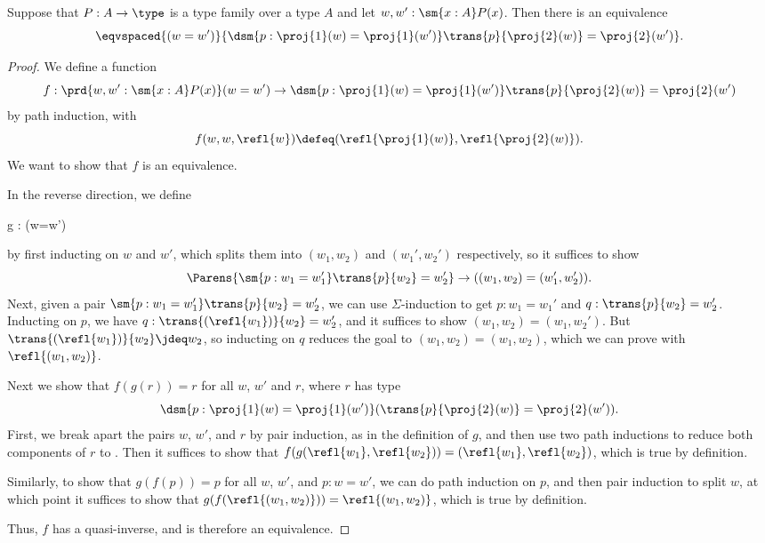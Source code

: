 %
\begin{thm}\label{thm:path-sigma}
Suppose that $P:A\to\type$ is a type family over a type $A$ and let $w,w':\sm{x:A}P(x)$. Then there is an equivalence
\begin{equation*}
\eqvspaced{(w=w')}{\dsm{p:\proj{1}(w)=\proj{1}(w')} \trans{p}{\proj{2}(w)}=\proj{2}(w')}.
\end{equation*}
\end{thm}

\begin{proof}
We define a function
\begin{equation*}
f : \prd{w,w':\sm{x:A}P(x)} (w=w') \to \dsm{p:\proj{1}(w)=\proj{1}(w')} \trans{p}{\proj{2}(w)}=\proj{2}(w')
\end{equation*}
by path induction, with
\begin{equation*}
f(w,w,\refl{w})\defeq(\refl{\proj{1}(w)},\refl{\proj{2}(w)}).
\end{equation*}
We want to show that $f$ is an equivalence.

In the reverse direction, we define
\begin{narrowmultline*}
  g : 
      \to
      \narrowbreak
      (w=w')
\end{narrowmultline*}
by first inducting on $w$ and $w'$, which splits them into $(w_1,w_2)$ and
$(w_1',w_2')$ respectively, so it suffices to show
\begin{equation*}
\Parens{\sm{p:w_1 = w_1'}\trans{p}{w_2}=w_2'} \to ((w_1,w_2)=(w_1',w_2')).
\end{equation*}
Next, given a pair $\sm{p:w_1 = w_1'}\trans{p}{w_2}=w_2'$, we can
use $\Sigma$-induction to get $p : w_1 = w_1'$ and $q :
\trans{p}{w_2}=w_2'$.  Inducting on $p$, we have $q :
\trans{(\refl{w_1})}{w_2}=w_2'$, and it suffices to show
$(w_1,w_2)=(w_1,w_2')$.  But $\trans{(\refl{w_1})}{w_2} \jdeq w_2$, so
inducting on $q$ reduces the goal to
$(w_1,w_2)=(w_1,w_2)$, which we can prove with $\refl{(w_1,w_2)}$.

Next we show that $f(g(r))=r$ for all $w$, $w'$ and
$r$, where $r$ has type
\[\dsm{p:\proj{1}(w)=\proj{1}(w')} (\trans{p}{\proj{2}(w)}=\proj{2}(w')).\]
First, we break apart the pairs $w$, $w'$, and $r$ by pair induction, as in the
definition of $g$, and then use two path inductions to reduce both components
of $r$ to .  Then it suffices to show that
$f (g(\refl{w_1},\refl{w_2})) = (\refl{w_1},\refl{w_2})$, which is true by definition.

Similarly, to show that $g(f(p))=p$ for all $w$, $w'$,
and $p : w = w'$, we can do path induction on $p$, and then pair induction to
split $w$, at which point it suffices to show that
$g(f (\refl{(w_1,w_2)})) = \refl{(w_1,w_2)}$, which is true by
definition.

Thus, $f$ has a quasi-inverse, and is therefore an equivalence.
\end{proof}
